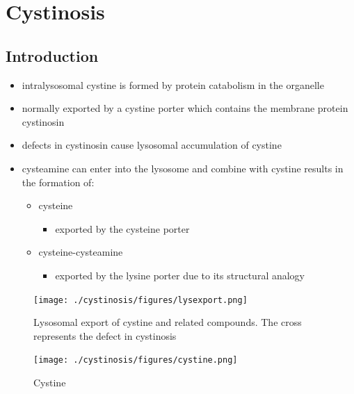 \documentclass{scrartcl}
\begin{document}
\section{Cystinosis}
\label{sec:org70589bf}
\subsection{Introduction}
\label{sec:org29f6924}
\begin{itemize}
\item intralysosomal cystine is formed by protein catabolism in the organelle
\item normally exported by a cystine porter which contains the membrane protein cystinosin
\item defects in cystinosin cause lysosomal accumulation of cystine
\item cysteamine can enter into the lysosome and combine with cystine results in the formation of:
\begin{itemize}
\item cysteine
\begin{itemize}
\item exported by the cysteine porter
\end{itemize}
\item cysteine-cysteamine
\begin{itemize}
\item exported by the lysine porter due to its structural analogy
\end{itemize}
\end{itemize}
\end{itemize}

\begin{figure}[htbp]
\centering
\texttt{[image: ./cystinosis/figures/lysexport.png]}
\caption{\label{fig:orge72744a}
Lysosomal export of cystine and related compounds. The cross represents the defect in cystinosis}
\end{figure}

\begin{figure}[htbp]
\centering
\texttt{[image: ./cystinosis/figures/cystine.png]}
\caption{\label{fig:org0ff2f85}
Cystine}
\end{figure}
\end{document}
